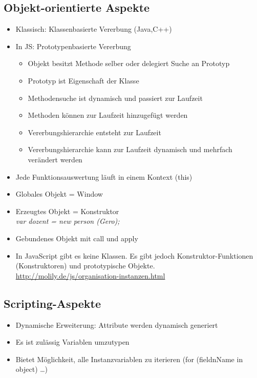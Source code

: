 \documentclass{article} %
\begin{document}
	\subsection{Objekt-orientierte Aspekte}
	\begin{itemize}
		\item Klassisch: Klassenbasierte Vererbung (Java,C++)
		\item In JS: Prototypenbasierte Vererbung
		\begin{itemize}
			\item Objekt besitzt Methode selber oder delegiert Suche an Prototyp
			\item Prototyp ist Eigenschaft der Klasse
			\item Methodensuche ist dynamisch und passiert zur Laufzeit
			\item Methoden können zur Laufzeit hinzugefügt werden
			\item Vererbungshierarchie entsteht zur Laufzeit
			\item Vererbungshierarchie kann zur Laufzeit dynamisch und mehrfach verändert werden
		\end{itemize}
		\item Jede Funktionsauswertung läuft in einem Kontext (this)
		\item Globales Objekt = Window 
		\item Erzeugtes Objekt = Konstruktor\\
		\textit{var dozent = new person (\glqq Gero\grqq);}
		\item Gebundenes Objekt mit call und apply
		\item In JavaScript gibt es keine Klassen. Es gibt jedoch Konstruktor-Funktionen (Konstruktoren) und prototypische Objekte.\\
		\url{http://molily.de/js/organisation-instanzen.html}
	\end{itemize}
	\subsection{Scripting-Aspekte}
	\begin{itemize}
		\item Dynamische Erweiterung: Attribute werden dynamisch generiert
		\item Es ist zulässig Variablen umzutypen
		\item Bietet Möglichkeit, alle Instanzvariablen zu iterieren (for (fieldnName in object) \dots)
	\end{itemize}
\end{document}
